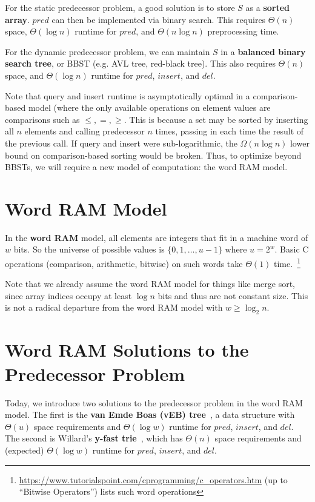 \documentclass[11pt]{article}
\begin{document}
For the static predecessor problem, a good solution is to store $S$ as a \textbf{sorted array}. $pred$ can then be implemented via binary search. This requires $\Theta(n)$ space, $\Theta(\log n)$ runtime for $pred$, and $\Theta(n \log n)$ preprocessing time.

For the dynamic predecessor problem, we can maintain $S$ in a \textbf{balanced binary search tree}, or BBST (e.g. AVL tree, red-black tree). This also requires $\Theta(n)$ space, and $\Theta(\log n)$ runtime for $pred$, $insert$, and $del$.

Note that query and insert runtime is asymptotically optimal in a comparison-based model (where the only available operations on element values are comparisons such as $\leq, =, \geq$. This is because a set may be sorted by inserting all $n$ elements and calling predecessor $n$ times, passing in each time the result of the previous call. If query and insert were sub-logarithmic, the $\Omega(n \log n)$ lower bound on comparison-based sorting would be broken. Thus, to optimize beyond BBSTs, we will require a new model of computation: the word RAM model.

\section{Word RAM Model}
In the \textbf{word RAM} model, all elements are integers that fit in a machine word of $w$ bits. So the universe of possible values is $\{0, 1, \dots, u - 1\}$ where $u = 2^w$. Basic C operations  (comparison, arithmetic, bitwise) on such words take $\Theta(1)$ time.~\footnote{\url{https://www.tutorialspoint.com/cprogramming/c_operators.htm} (up to ``Bitwise Operators'') lists such word operations}

Note that we already assume the word RAM model for things like merge sort, since array indices occupy at least $\log n$ bits and thus are not constant size. This is not a radical departure from the word RAM model with $w \geq \log_2 n$.

\section{Word RAM Solutions to the Predecessor Problem}
Today, we introduce two solutions to the predecessor problem in the word RAM model. The first is the \textbf{van Emde Boas (vEB) tree}~\cite{vebFOCS75}, a data structure with $\Theta(u)$ space requirements and $\Theta(\log w)$ runtime for $pred$, $insert$, and $del$. The second is Willard's \textbf{y-fast trie}~\cite{willardIPL83}, which has $\Theta(n)$ space requirements and (expected) $\Theta(\log w)$ runtime for $pred$, $insert$, and $del$.
\end{document}
